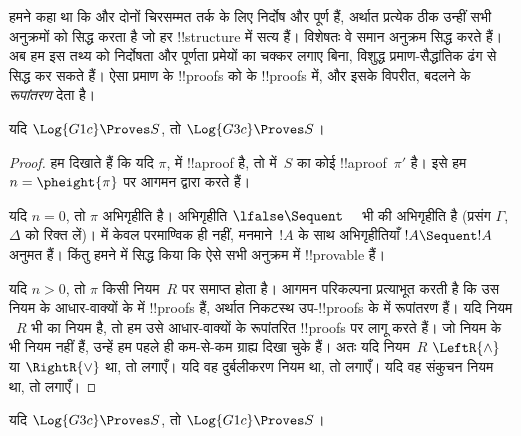 \documentclass[../../../include/open-logic-section]{subfiles}
\begin{document}


हमने कहा था कि  और  दोनों चिरसम्मत तर्क के लिए निर्दोष और
पूर्ण हैं, अर्थात प्रत्येक ठीक उन्हीं सभी अनुक्रमों को सिद्ध करता है जो हर
!!{structure} में सत्य हैं। विशेषतः वे समान अनुक्रम सिद्ध करते हैं। अब हम इस
तथ्य को निर्दोषता और पूर्णता प्रमेयों का चक्कर लगाए बिना, विशुद्ध
प्रमाण-सैद्धांतिक ढंग से सिद्ध कर सकते हैं। ऐसा प्रमाण  के
!!{proof}s को  के !!{proof}s में, और इसके विपरीत, बदलने के
\emph{रूपांतरण} देता है।

\begin{prop}
यदि $\Log{G1c} \Proves S$, तो $\Log{G3c} \Proves S$।
\end{prop}

\begin{proof}
  हम दिखाते हैं कि यदि $\pi$,  में !!a{proof} है, तो 
  में~$S$ का कोई !!a{proof}~$\pi'$ है। इसे हम $n = \pheight{\pi}$ पर आगमन
  द्वारा करते हैं।

  यदि $n = 0$, तो $\pi$ अभिगृहीति है। अभिगृहीति $\lfalse \Sequent \quad$
  भी  की अभिगृहीति है (प्रसंग $\Gamma$, $\Delta$ को रिक्त लें)।
   में केवल परमाण्विक ही नहीं, मनमाने~$!A$ के साथ अभिगृहीतियाँ
  $!A \Sequent !A$ अनुमत हैं। किंतु हमने  में
  सिद्ध किया कि ऐसे सभी अनुक्रम  में !!{provable} हैं।
  
  यदि $n>0$, तो $\pi$ किसी नियम~$R$ पर समाप्त होता है। आगमन परिकल्पना
  प्रत्याभूत करती है कि उस नियम के आधार-वाक्यों के  में !!{proof}s
  हैं, अर्थात निकटस्थ उप-!!{proof}s के  में रूपांतरण हैं। यदि नियम
  ~$R$ भी  का नियम है, तो हम उसे आधार-वाक्यों के रूपांतरित
  !!{proof}s पर लागू करते हैं। जो नियम  के भी नियम नहीं हैं, उन्हें
  हम पहले ही कम-से-कम ग्राह्य दिखा चुके हैं। अतः यदि नियम~$R$
  $\LeftR{\land}$ या $\RightR{\lor}$ था, तो
   लगाएँ। यदि वह दुर्बलीकरण नियम था, तो
   लगाएँ। यदि वह संकुचन नियम था, तो
   लगाएँ।
\end{proof}

\begin{prop}
यदि $\Log{G3c} \Proves S$, तो $\Log{G1c} \Proves S$।
\end{prop}
\end{document}
